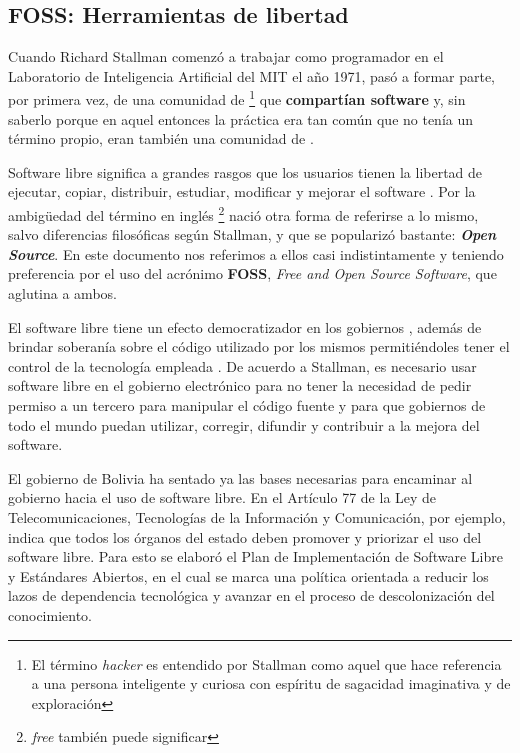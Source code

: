 \subsection{FOSS: Herramientas de libertad}

Cuando Richard Stallman comenzó a trabajar como programador en el Laboratorio de Inteligencia Artificial del MIT el año 1971, 
pasó a formar parte, por primera vez, de una comunidad de 
\footnote{El término \textit{hacker} es entendido por Stallman como aquel que hace referencia a una persona inteligente y curiosa con espíritu de sagacidad imaginativa y de exploración}
que \textbf{compartían software} y, sin saberlo porque en aquel entonces la práctica era tan común que no tenía un término propio, eran también una comunidad de  \cite{stallmanSoftwareLibrePara}.

Software libre significa a grandes rasgos que los usuarios tienen la libertad de ejecutar, copiar, distribuir, estudiar, modificar y mejorar el software \cite{QueEsSoftware}.
Por la ambigüedad del término en inglés
\footnote{\textit{free} también puede significar } 
nació otra forma de referirse a lo mismo, salvo diferencias filosóficas según Stallman\cite{WhyOpenSource}, y que se popularizó bastante: \textbf{\textit{Open Source}}. 
En este documento nos referimos a ellos casi indistintamente y teniendo preferencia por el uso del acrónimo \textbf{FOSS}, \textit{Free and Open Source Software}, que aglutina a ambos.

El software libre tiene un efecto democratizador en los gobiernos \cite{donorfioPoliticsFreeOpen2004}, 
además de brindar soberanía sobre el código utilizado por los mismos permitiéndoles tener el control de la tecnología empleada \cite{LibertadSoftwareSu}. 
De acuerdo a Stallman, es necesario usar software libre en el gobierno electrónico para no tener la necesidad de pedir permiso a un tercero para manipular el código fuente y para que gobiernos de todo el mundo puedan utilizar, corregir, difundir y contribuir a la mejora del software\cite{SoftwareLibreGobierno}.

El gobierno de Bolivia ha sentado ya las bases necesarias para encaminar al gobierno hacia el uso de software libre. 
En el Artículo 77 de la Ley de Telecomunicaciones, Tecnologías de la Información y Comunicación, por ejemplo, indica que todos los órganos del estado deben promover y priorizar el uso del software libre\cite{Ley164Ley2011}.
Para esto se elaboró el Plan de Implementación de Software Libre y Estándares Abiertos, en el cual se marca una política orientada a reducir los lazos de dependencia tecnológica y avanzar en el proceso de descolonización del conocimiento\cite{PLANIMPLEMENTACIONSOFTWARE}.

